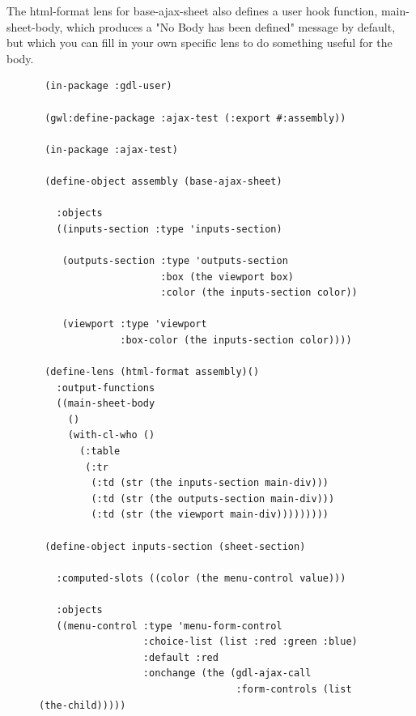\documentclass [11pt]{book}
\begin{document}
\begin{itemize}
\begin{description}
The html-format lens for base-ajax-sheet also defines a user hook function,
main-sheet-body, which produces a "No Body has been defined" message by default, 
but which you can fill in your own specific lens to do something useful for the body.



\end{description}




\begin{figure}
\begin{lrbox}{\boxedverb}
\begin{minipage}{\linewidth}
{\small

\begin{verbatim}
 (in-package :gdl-user)

 (gwl:define-package :ajax-test (:export #:assembly))

 (in-package :ajax-test)

 (define-object assembly (base-ajax-sheet)

   :objects
   ((inputs-section :type 'inputs-section)
   
    (outputs-section :type 'outputs-section
                     :box (the viewport box)
                     :color (the inputs-section color))
   
    (viewport :type 'viewport
              :box-color (the inputs-section color))))

 (define-lens (html-format assembly)()
   :output-functions
   ((main-sheet-body
     ()
     (with-cl-who ()
       (:table 
        (:tr
         (:td (str (the inputs-section main-div)))
         (:td (str (the outputs-section main-div)))
         (:td (str (the viewport main-div)))))))))

 (define-object inputs-section (sheet-section)

   :computed-slots ((color (the menu-control value)))
  
   :objects
   ((menu-control :type 'menu-form-control
                  :choice-list (list :red :green :blue)
                  :default :red
                  :onchange (the (gdl-ajax-call 
                                  :form-controls (list (the-child)))))
   

\end{verbatim}}
\end{minipage}
\end{lrbox}
\end{figure}
\end{itemize}
\end{document}
